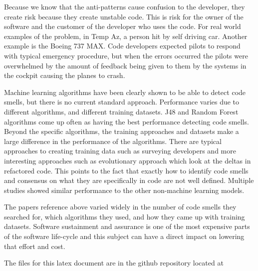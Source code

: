 \documentclass[conference]{IEEEtran}
\begin{document}
Because we know that the anti-patterns cause confusion to the developer, they create risk because they create unstable code. 
This is risk for the owner of the software and the customer of the developer who uses the code.
For real world examples of the problem, in Temp Az, a person hit by self driving car\cite{noauthor_how_nodate}. 
Another example is the Boeing 737 MAX.
Code developers expected pilots to respond with typical emergency procedure, but when the errors occurred the pilots were overwhelmed by the amount of feedback being given to them by the systems in the cockpit\cite{noauthor_boeing_nodate} causing the planes to crash.

Machine learning algorithms have been clearly shown to be able to detect code smells, but there is no current standard approach. 
Performance varies due to different algorithms, and different training datasets. 
J48 and Random Forest algorithms come up often as having the best performance detecting code smells.
Beyond the specific algorithms, the training approaches and datasets make a large difference in the performance of the algorithms. 
There are typical approaches to creating training data such as surveying developers and more interesting approaches such as evolutionary approach which look at the deltas in refactored code.
This points to the fact that exactly how to identify code smells and consensus on what they are specifically in code are not well defined. 
Multiple studies showed similar performance to the other non-machine learning models.

The papers reference above varied widely in the number of code smells they searched for, which algorithms they used, and how they came up with training datasets.
Software sustainment and assurance is one of the most expensive parts of the software life-cycle\cite{li_progress_2018} and this subject can have a direct impact on lowering that effort and cost.

The files for this latex document are in the github repository located at 




\end{document}
